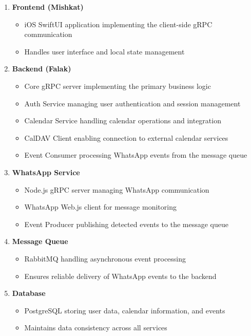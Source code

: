 \documentclass[12pt,a4paper,twoside]{report}
\begin{document}
\begin{enumerate}
    \item \textbf{Frontend (Mishkat)}
          \begin{itemize}
              \item iOS SwiftUI application implementing the client-side gRPC communication
              \item Handles user interface and local state management
          \end{itemize}

    \item \textbf{Backend (Falak)}
          \begin{itemize}
              \item Core gRPC server implementing the primary business logic
              \item Auth Service managing user authentication and session management
              \item Calendar Service handling calendar operations and integration
              \item CalDAV Client enabling connection to external calendar services
              \item Event Consumer processing WhatsApp events from the message queue
          \end{itemize}

    \item \textbf{WhatsApp Service}
          \begin{itemize}
              \item Node.js gRPC server managing WhatsApp communication
              \item WhatsApp Web.js client for message monitoring
              \item Event Producer publishing detected events to the message queue
          \end{itemize}

    \item \textbf{Message Queue}
          \begin{itemize}
              \item RabbitMQ handling asynchronous event processing
              \item Ensures reliable delivery of WhatsApp events to the backend
          \end{itemize}

    \item \textbf{Database}
          \begin{itemize}
              \item PostgreSQL storing user data, calendar information, and events
              \item Maintains data consistency across all services
          \end{itemize}
\end{enumerate}
\end{document}
